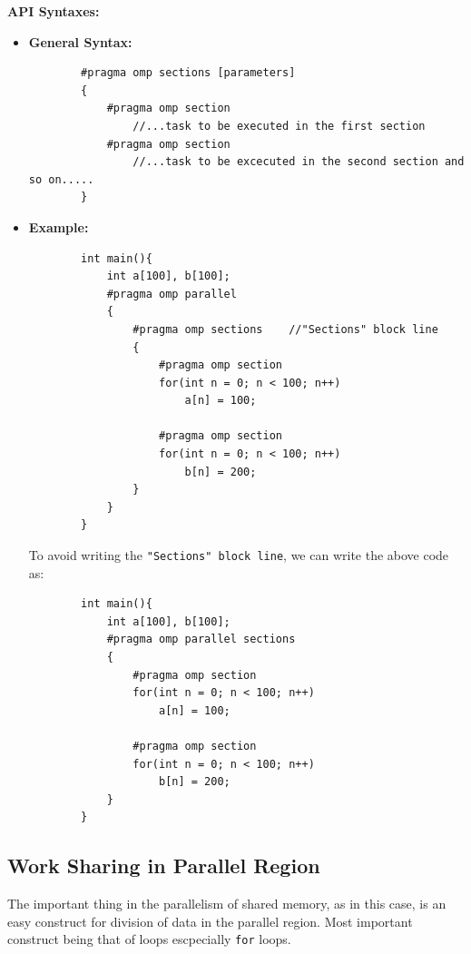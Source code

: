 \documentclass[12pt, a4paper]{report}
\begin{document}
{\bfseries{API Syntaxes:}}
\begin{itemize}
    \item {\bfseries{General Syntax:}}
    \begin{verbatim}
        #pragma omp sections [parameters]
        {
            #pragma omp section
                //...task to be executed in the first section
            #pragma omp section
                //...task to be excecuted in the second section and so on.....
        }
    \end{verbatim}
    \item {\bfseries{Example:}}
    \begin{verbatim}
        int main(){
            int a[100], b[100];
            #pragma omp parallel                  
            {                           
                #pragma omp sections    //"Sections" block line
                {
                    #pragma omp section
                    for(int n = 0; n < 100; n++)
                        a[n] = 100;

                    #pragma omp section
                    for(int n = 0; n < 100; n++)
                        b[n] = 200;
                }
            }
        }
    \end{verbatim}
    To avoid writing the {\texttt{"Sections" block line}}, we can write the above code as:
    \begin{verbatim}
        int main(){
            int a[100], b[100];
            #pragma omp parallel sections                
            {                           
                #pragma omp section
                for(int n = 0; n < 100; n++)
                    a[n] = 100;

                #pragma omp section
                for(int n = 0; n < 100; n++)
                    b[n] = 200;
            }
        }
    \end{verbatim}
\end{itemize}

\subsection{Work Sharing in Parallel Region}
The important thing in the parallelism of shared memory, as in this case, is an easy construct for division of data in the parallel region.
Most important construct being that of loops escpecially {\texttt{for}} loops.
\end{document}
